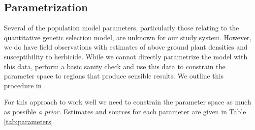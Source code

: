 \documentclass[10pt,letterpaper]{article}
\begin{document}
\subsection*{Parametrization}
Several of the population model parameters, particularly those relating to the quantitative genetic selection model, are unknown for our study system. However, we do have field observations with estimates of above ground plant densities and susceptibility to herbicide. While we cannot directly parametrize the model with this data, perform a basic sanity check and use this data to constrain the parameter space to regions that produce sensible results. We outline this procedure in .  

For this approach to work well we need to constrain the parameter space as much as possible \textit{a prior}. Estimates and sources for each parameter are given in Table \ref{tab:parameters}.          
\end{document}

